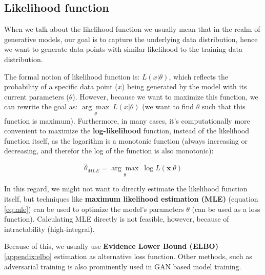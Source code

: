 \subsection{Likelihood function}
\label{appendix:likelihood_function}

When we talk about the likelihood function we usually mean that in the realm of generative models, our goal is to capture the underlying data distribution, hence we want to generate data points with similar likelihood to the training data distribution. 

The formal notion of likelihood function is: $L(x | \theta)$, which reflects the probability of a specific data point ($x$) being generated by the model with its current parameters ($\theta$). However, because we want to maximize this function, we can rewrite the goal as: $\underset{\theta}{\arg\max}\ L(x | \theta)$ (we want to find $\theta$ such that this function is maximum). Furthermore, in many cases, it's computationally more convenient to maximize the \textbf{log-likelihood} function, instead of the likelihood function itself, as the logarithm is a monotonic function (always increasing or decreasing, and therefor the log of the function is also monotonic):

\begin{equation}
\label{eq:mle}
    \hat{\theta}_{MLE} = \underset{\theta}{\arg\max} \ \log L(\mathbf{x} | \theta)
\end{equation}


In this regard, we might not want to directly estimate the likelihood function itself, but techniques like \textbf{maximum likelihood estimation (MLE)} (equation \ref{eq:mle}) can be used to optimize the model's parameters $\theta$ (can be used as a loss function). Calculating MLE directly is not feasible, however, because of intractability (high-integral).

Because of this, we usually use \textbf{Evidence Lower Bound (ELBO)} \ref{appendix:elbo} estimation as alternative loss function. Other methods, such as adversarial training is also prominently used in GAN based model training.